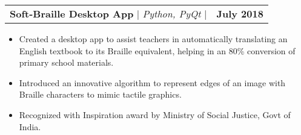 \documentclass[letterpaper,11pt]{article}
\makeatletter
\newcommand{\resumeItem}[1]{
  \item\small{
    {#1 \vspace{-2pt}}
  }
}
\newcommand{\resumeProjectHeading}[2]{
    \item
    \begin{tabular*}{1.001\textwidth}{l@{\extracolsep{\fill}}r}
      \small#1 & \textbf{\small #2}\\
    \end{tabular*}\vspace{-7pt}
}
\newcommand{\resumeItemListStart}{\begin{itemize}}
\newcommand{\resumeItemListEnd}{\end{itemize}\vspace{-5pt}}
\makeatother
\begin{document}
        \resumeProjectHeading
            {\textbf{Soft-Braille Desktop App} $|$ \emph{Python, PyQt} $|$ \href{https://github.com/ACprime96/SoftBraille}{\faGithub}}{July 2018}
            \resumeItemListStart
                \resumeItem{Created a desktop app to assist teachers in automatically translating an English textbook to its Braille equivalent, helping in an 80\% conversion of primary school materials.}
                \resumeItem{Introduced an innovative algorithm to represent edges of an image with Braille characters to mimic tactile graphics.}
                \resumeItem{Recognized with Inspiration award by Ministry of Social Justice, Govt of India. }
            \resumeItemListEnd 
        \vspace{-16pt}
\end{document}
